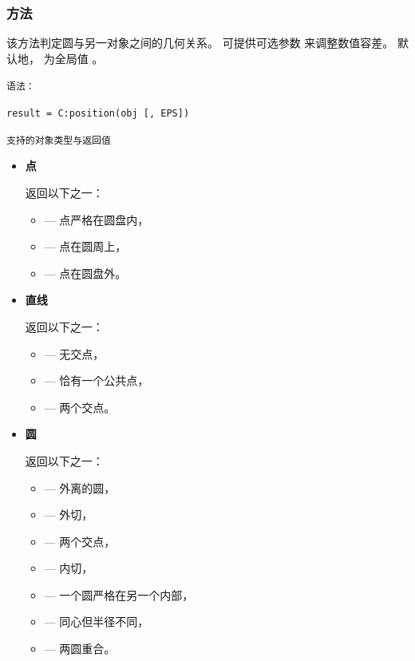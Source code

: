 \subsubsection{方法 }
\label{ssub:circle_position}

该方法判定圆与另一对象之间的几何关系。
可提供可选参数  来调整数值容差。
默认地， 为全局值 。

\medskip
\texttt{语法：}

\verb|result = C:position(obj [, EPS])|

\medskip
\texttt{支持的对象类型与返回值}

\begin{itemize}

\item \textbf{点}

返回以下之一：
\begin{itemize}
\item {}  — 点严格在圆盘内，
\item {}  — 点在圆周上，
\item {} — 点在圆盘外。
\end{itemize}

\item \textbf{直线}

返回以下之一：
\begin{itemize}
\item {} — 无交点，
\item {}  — 恰有一个公共点，
\item {}   — 两个交点。
\end{itemize}

\item \textbf{圆}

返回以下之一：
\begin{itemize}
\item {} — 外离的圆，
\item {}  — 外切，
\item {}        — 两个交点，
\item {}  — 内切，
\item {} — 一个圆严格在另一个内部，
\item {}    — 同心但半径不同，
\item {}    — 两圆重合。
\end{itemize}

\end{itemize}

